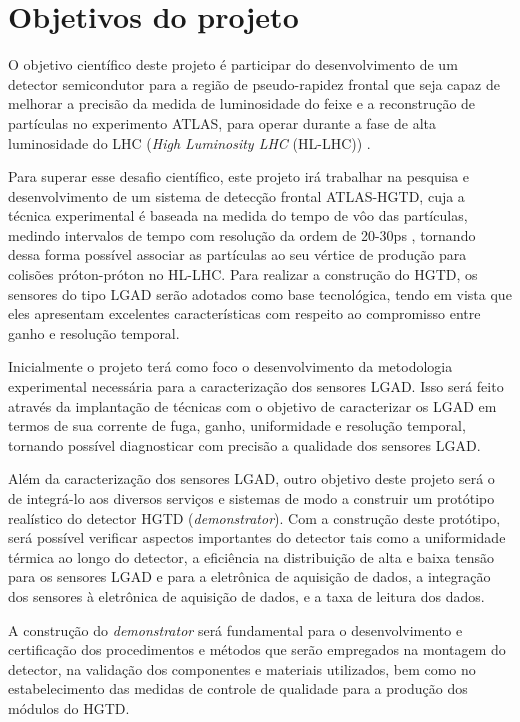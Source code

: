 
\chapter{Objetivos do projeto}

O objetivo científico deste projeto é participar do desenvolvimento de um detector semicondutor para a região de pseudo-rapidez frontal que seja capaz de melhorar a precisão da medida de luminosidade do feixe e a reconstrução de partículas no experimento ATLAS, para operar durante a fase de alta luminosidade do LHC ({\it High Luminosity LHC} (HL-LHC)) \cite{HL_LHC,tdr}. 

Para superar esse desafio científico, este projeto irá trabalhar na pesquisa e desenvolvimento de um sistema de detecção frontal ATLAS-HGTD, cuja a técnica experimental é baseada na medida do tempo de vôo das partículas, medindo intervalos de tempo com resolução da ordem de 20-30ps \cite{tdr}, tornando dessa forma possível associar as partículas ao seu vértice de produção para colisões próton-próton no HL-LHC. Para realizar a construção do HGTD, os sensores do tipo LGAD serão adotados como base tecnológica, tendo em vista que eles apresentam excelentes características com respeito ao compromisso entre ganho e resolução temporal. 
\thispagestyle{plain}

Inicialmente o projeto terá como foco o desenvolvimento da metodologia experimental necessária para a caracterização dos sensores LGAD. Isso será feito através da implantação de técnicas com o objetivo de caracterizar os LGAD em termos de sua corrente de fuga, ganho, uniformidade e resolução temporal, tornando possível diagnosticar com precisão a qualidade dos sensores LGAD.

Além da caracterização dos sensores LGAD, outro objetivo deste projeto será o de integrá-lo aos diversos serviços e sistemas de modo a construir um protótipo realístico do detector HGTD (\textit{demonstrator}). Com a construção deste protótipo, será possível verificar aspectos importantes do detector tais como a uniformidade térmica ao longo do detector, a eficiência na distribuição de alta e baixa tensão para os sensores LGAD e para a eletrônica de aquisição de dados, a integração dos sensores à eletrônica de aquisição de dados, e a taxa de leitura dos dados.

A construção do \textit{demonstrator} será fundamental para o desenvolvimento e certificação dos procedimentos e métodos que serão empregados na montagem do detector, na validação dos componentes e materiais utilizados, bem como no estabelecimento das medidas de controle de qualidade para a produção dos módulos do HGTD.


